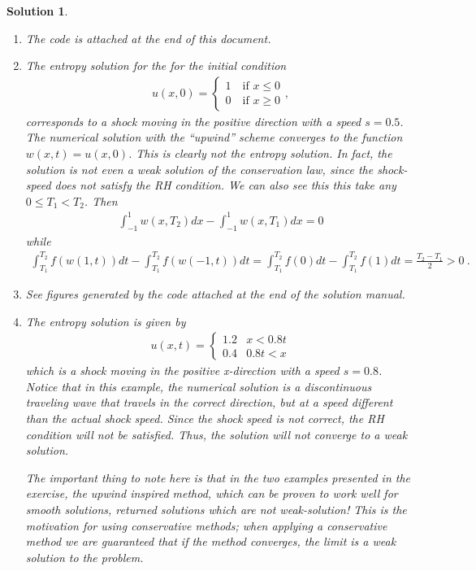 \documentclass[10pt,letterpaper]{article}
\newcommand{\frb}[1]{ \left(  {#1} \right) }
\theoremstyle{break}
\newtheorem{mysolution}{Solution}
\newenvironment{solution}{\begin{mysolution}}{\end{mysolution}}
\begin{document}
\begin{solution}
	\begin{enumerate}

		\item The code is attached at the end of this document.
		\item The entropy solution for the for the initial condition
		\begin{gather}
		u(x,0) = \begin{cases} 1 \quad \text{if } x\leq 0 \\0 \quad \text{if } x\geq 0 \end{cases},
		\end{gather}
		corresponds to a shock moving in the positive direction with a speed $s=0.5$.
		The numerical solution with the ``upwind'' scheme converges to the function $w(x,t)=u(x,0)$. This is clearly not the entropy solution. In fact, the solution is not even a weak solution of the conservation law, since the shock-speed does not satisfy the RH condition. We can also see this
		this take any $0\leq T_{1}<T_{2}$. Then 
		\begin{gather}
			\int_{-1}^{1}w\frb{x,T_{2}}dx-\int_{-1}^{1}w\frb{x,T_{1}}dx=0
		\end{gather}
		while
		\begin{gather}
			\int_{T_{1}}^{T_{2}}f\frb{w\frb{1,t}}dt -\int_{T_{1}}^{T_{2}}f\frb{w\frb{-1,t}}dt
				=\int_{T_{1}}^{T_{2}}f\frb{0}dt-\int_{T_{1}}^{T_{2}}f\frb{1}dt
				=\frac{T_{2}-T_{1}}{2}>0\ .
		\end{gather}
		
		\item
		See figures generated by the code attached at the end of the solution manual.
		
		\item
		The entropy solution is given by 
		\begin{gather}
			u(x,t)=\begin{cases}
				1.2 & x<0.8t\\
				0.4 & 0.8t<x
			\end{cases}
		\end{gather}
		which is a shock moving in the positive x-direction with a speed $s=0.8$. 
		Notice that in this example, the numerical solution is a discontinuous traveling wave that travels in the correct direction, but at a speed different than the actual shock speed. Since the shock speed is not correct, the RH condition will not be satisfied. Thus, the solution will not converge to a weak solution. 
		
		The important thing to note here is that in the two examples presented in the exercise, the upwind inspired method, which can be proven to work well for smooth solutions, returned solutions which are not weak-solution! This is the motivation for using conservative methods; when applying a conservative method we are guaranteed that if the method converges, the limit is a weak solution to the problem.
	\end{enumerate}
\end{solution}
\end{document}
